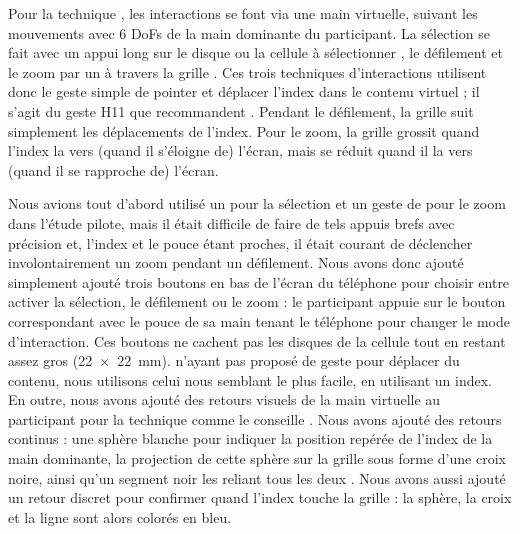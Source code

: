 Pour la technique , les interactions se font via une main virtuelle, suivant les mouvements avec 6 DoFs de la main dominante du participant. La sélection se fait avec un appui long sur le disque ou la cellule à sélectionner , le défilement et le zoom par un  à travers la grille . Ces trois techniques d'interactions utilisent donc le geste simple de pointer et déplacer l'index dans le contenu virtuel ; il s'agit du geste H11 que \cite{Piumsomboon2013} recommandent . Pendant le défilement, la grille suit simplement les déplacements de l'index. Pour le zoom, la grille grossit quand l'index la  vers (quand il s'éloigne de) l'écran, mais se réduit quand il la  vers (quand il se rapproche de) l'écran.

Nous avions tout d'abord utilisé un  pour la sélection et un geste de  pour le zoom dans l'étude pilote, mais il était difficile de faire de tels appuis brefs avec précision et, l'index et le pouce étant proches, il était courant de déclencher involontairement un zoom pendant un défilement. Nous avons donc ajouté simplement ajouté trois boutons en bas de l'écran du téléphone pour choisir entre activer la sélection, le défilement ou le zoom : le participant appuie sur le bouton correspondant avec le pouce de sa main tenant le téléphone pour changer le mode d'interaction. Ces boutons ne cachent pas les disques de la cellule  tout en restant assez gros (\SI{22x22}{\mm}). \cite{Piumsomboon2013} n'ayant pas proposé de geste pour déplacer du contenu, nous utilisons celui nous semblant le plus facile, en utilisant un index. 
En outre, nous avons ajouté des retours visuels de la main virtuelle au participant pour la technique  comme le conseille \cite{Chan2010}. Nous avons ajouté des retours continus : une sphère blanche pour indiquer la position repérée de l'index de la main dominante, la projection de cette sphère sur la grille sous forme d'une croix noire, ainsi qu'un segment noir les reliant tous les deux . Nous avons aussi ajouté un retour discret pour confirmer quand l'index touche la grille : la sphère, la croix et la ligne sont alors colorés en bleu.


